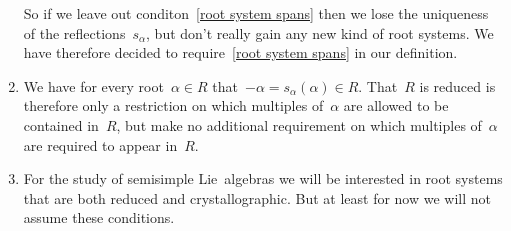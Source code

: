 \begin{remark}
\begin{enumerate}
      So if we leave out conditon~\ref*{root system spans} then we lose the uniqueness of the reflections~$s_\alpha$, but don’t really gain any new kind of root systems.
      We have therefore decided to require~\ref*{root system spans} in our definition.
    \item
      We have for every root~$\alpha \in R$ that~$-\alpha = s_\alpha(\alpha) \in R$.
      That~$R$ is reduced is therefore only a restriction on which multiples of~$\alpha$ are allowed to be contained in~$R$, but make no additional requirement on which multiples of~$\alpha$ are required to appear in~$R$.
%      
%      
    \item
      For the study of semisimple Lie~algebras we will be interested in root systems that are both reduced and crystallographic.
      But at least for now we will not assume these conditions.
  \end{enumerate}
\end{remark}


